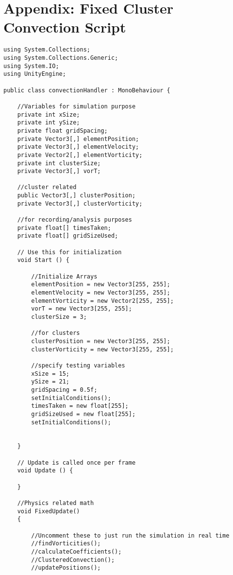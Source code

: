 \section{Appendix: Fixed Cluster Convection Script}

\begin{mdframed}[linecolor=black, topline=true, bottomline=true,
  leftline=false, rightline=false]
\begin{verbatim}
using System.Collections;
using System.Collections.Generic;
using System.IO;
using UnityEngine;

public class convectionHandler : MonoBehaviour {

    //Variables for simulation purpose
    private int xSize;
    private int ySize;
    private float gridSpacing;
    private Vector3[,] elementPosition;
    private Vector3[,] elementVelocity;
    private Vector2[,] elementVorticity;
    private int clusterSize;
    private Vector3[,] vorT;

    //cluster related
    public Vector3[,] clusterPosition;
    private Vector3[,] clusterVorticity;

    //for recording/analysis purposes
    private float[] timesTaken;
    private float[] gridSizeUsed;

    // Use this for initialization
    void Start () {

        //Initialize Arrays
        elementPosition = new Vector3[255, 255];
        elementVelocity = new Vector3[255, 255];
        elementVorticity = new Vector2[255, 255];
        vorT = new Vector3[255, 255];
        clusterSize = 3;

        //for clusters
        clusterPosition = new Vector3[255, 255];
        clusterVorticity = new Vector3[255, 255];

        //specify testing variables
        xSize = 15;
        ySize = 21;
        gridSpacing = 0.5f;
        setInitialConditions();
        timesTaken = new float[255];
        gridSizeUsed = new float[255];
        setInitialConditions();


    }
	
	// Update is called once per frame
	void Update () {
		
	}

    //Physics related math
    void FixedUpdate()
    {

        //Uncomment these to just run the simulation in real time
        //findVorticities();
        //calculateCoefficients();
        //ClusteredConvection();
        //updatePositions();


\end{verbatim}
\end{mdframed}
